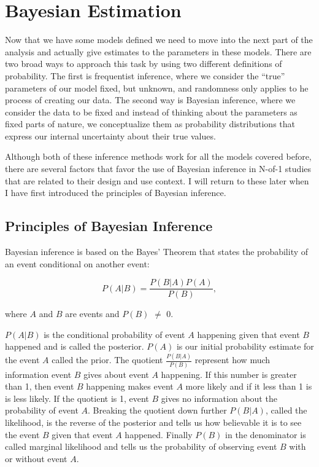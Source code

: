 \documentclass[12pt,a4paper,leqno]{report}
\theoremstyle{plain}
\theoremstyle{definition}
\theoremstyle{remark}
\begin{document}
\chapter{Bayesian Estimation}\label{bayes}

Now that we have some models defined we need to move into the next part of the
analysis and actually give estimates to the parameters in these models. There are two
broad ways to approach this task by using two different definitions of probability.
The first is frequentist inference, where we consider the ``true'' parameters of our model fixed,
but unknown, and randomness only applies to he process of creating our data.
The second way is Bayesian inference, where we consider the data to be fixed and instead of thinking
about the parameters as fixed parts of nature, we conceptualize them as probability distributions
that express our internal uncertainty about their true values.

Although both of these inference methods work for all the models covered before,
there are several factors that favor the use of
Bayesian inference in N-of-1 studies that are related to their design and use context.
I will return to these later when I have first introduced the principles of Bayesian inference.

\section{Principles of Bayesian Inference}\label{whybayes}

Bayesian inference is based on the Bayes' Theorem that states the probability of an event
conditional on another event:

\begin{def}\label{bayesrule}
    \begin{equation}
        P(A|B) = \frac{P(B|A)P(A)}{P(B)},
    \end{equation}
\end{def}where \(A\) and \(B\) are events and \(P(B)\) \(\neq \) 0.

\(P(A|B)\) is the conditional probability of event \(A\) happening given that event \(B\) happened and is
called the posterior. \(P(A)\) is our initial probability estimate for the event \(A\)
called the prior. The quotient \(\frac{P(B|A)}{P(B)}\) represent how much information
event \(B\) gives about event \(A\) happening. If this number is greater than 1,
then event \(B\) happening makes event \(A\) more likely and if it less than 1
is is less likely. If the quotient is 1, event \(B\) gives no information
about the probability of event \(A\).
Breaking the quotient down further \(P(B|A)\), called the likelihood, is the reverse of the posterior
and tells us how believable
it is to see the event \(B\) given that event \(A\) happened. Finally \(P(B)\) in the
denominator is called marginal likelihood and tells us the probability of observing
event \(B\) with or without event \(A\).
\end{document}
